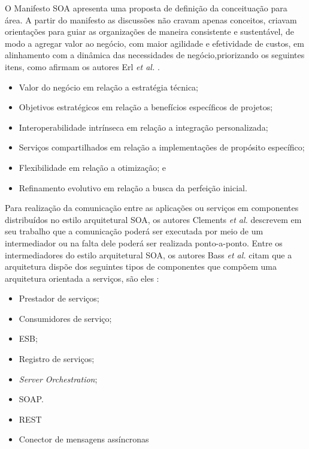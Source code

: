 O Manifesto \acrshort{SOA} apresenta uma proposta de definição da conceituação para área. A partir do manifesto as discussões não cravam apenas conceitos, criavam orientações para guiar as organizações de maneira consistente e sustentável, de modo a agregar valor ao negócio, com maior agilidade e efetividade de custos, em alinhamento com a dinâmica das necessidades de negócio,priorizando os seguintes itens, como afirmam os autores Erl \textit{et al.} \cite{erl2009soa}.

\begin{itemize}

\item Valor do negócio em relação a estratégia técnica;

\item Objetivos estratégicos em relação a benefícios específicos de projetos;

\item Interoperabilidade intrínseca em relação a integração personalizada;

\item Serviços compartilhados em relação a implementações de propósito específico;

\item Flexibilidade em relação a otimização; e

\item Refinamento evolutivo em relação a busca da perfeição inicial.

\end{itemize}

Para realização da comunicação entre as aplicações ou serviços em componentes distribuídos no estilo arquitetural \acrshort{SOA}, os autores Clements \textit{et al.}  \cite{clements2002documenting} descrevem em seu trabalho que a comunicação poderá ser executada por meio de um intermediador ou na falta dele poderá ser realizada ponto-a-ponto. Entre os intermediadores do estilo arquitetural \acrshort{SOA}, os autores Bass \textit{et al.} \cite{bass2003software} citam que a arquitetura dispõe dos seguintes tipos de componentes que compõem uma arquitetura orientada a serviços, são eles :

\begin{itemize}

\item Prestador de serviços;

\item Consumidores de serviço;

\item \acrfull{ESB};

\item Registro de serviços;

\item \textit{Server Orchestration}; 

\item \acrfull{SOAP}.

\item \acrfull{REST}

\item Conector de mensagens assíncronas

\end{itemize}

